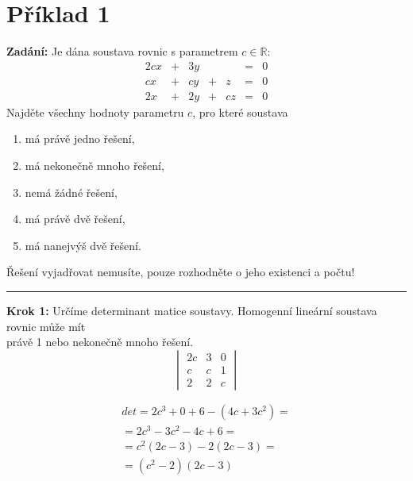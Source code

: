 \section{Příklad 1}
\textbf{Zadání:} Je dána soustava rovnic s parametrem $c \in \mathbb{R}$:\\
\begin{displaymath}
\begin{matrix}
&2cx&+&3y&&&=&0\\
&cx&+&cy&+&z&=&0&\\
&2x&+&2y&+&cz&=&0&
\end{matrix}
\end{displaymath}
Najděte všechny hodnoty parametru $c$, pro které soustava
\begin{enumerate}[label=\alph*)]
    \item má právě jedno řešení,
    \item má nekonečně mnoho řešení,
    \item nemá žádné řešení,
    \item má právě dvě řešení,
    \item má nanejvýš dvě řešení.
\end{enumerate}
Řešení vyjadřovat nemusíte, pouze rozhodněte o jeho existenci a počtu!
\par\noindent\rule{\textwidth}{0.4pt}

\textbf{Krok 1:} Určíme determinant matice soustavy. Homogenní lineární soustava rovnic může mít\\právě 1 nebo nekonečně mnoho řešení.
\begin{displaymath}
\begin{vmatrix}
2c & 3 & 0 \\ 
c & c & 1 \\ 
2 & 2 & c
\end{vmatrix}
\end{displaymath}

\begin{displaymath}
\begin{matrix}
det = 2c^3 + 0 + 6 - (4c+3c^2)=\\
=2c^3-3c^2-4c+6=\\
=c^2(2c-3)-2(2c-3)=\\
=(c^2-2)(2c-3)
\end{matrix}
\end{displaymath}

